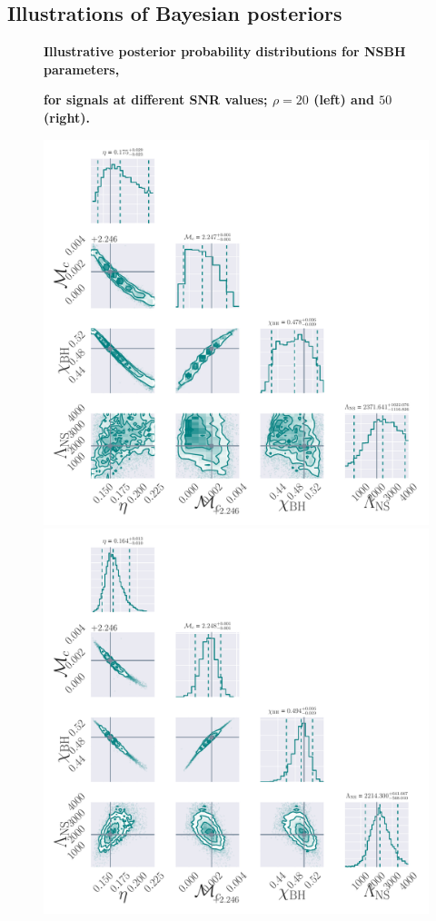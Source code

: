 \documentclass[aps,prd,amsmath,floats,floatfix, twocolumn,
superscriptaddress,nofootinbib,showpacs]{revtex4-1}
\begin{document}
\begin{appendix}
\section{Illustrations of Bayesian posteriors}\label{as1:illustrations}
% 
\begin{figure}
\centering
\textbf{Illustrative posterior probability distributions for NSBH parameters,}\par
\textbf{for signals at different SNR values; $\rho = 20$ (left) and $50$ (right).}\par\medskip
\includegraphics[width=1.05\columnwidth,trim=2cm 0 0 0]{plots/AllParamsMcEtPDF1D2D_q4_mc2_25_chi0_50_snr20}%
\includegraphics[width=1.05\columnwidth,trim=2cm 0 0 0]{plots/AllParamsMcEtPDF1D2D_q4_mc2_25_chi0_50_snr50}%

\end{figure}
\end{appendix}
\end{document}
